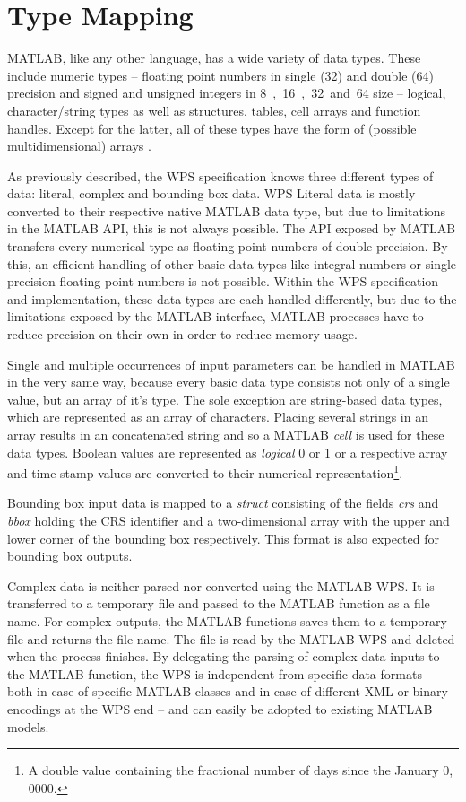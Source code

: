 \section{Type Mapping}
  \label{sec:matlab:type}
  MATLAB, like any other language, has a wide variety of data types. These include numeric types -- floating point numbers in single (\unit{32}{\bit}) and double (\unit{64}{\bit}) precision and signed and unsigned integers in \unit{8, 16, 32 and 64}{\bit} size -- logical, character/string types as well as structures, tables, cell arrays and function handles. Except for the latter, all of these types have the form of (possible multidimensional) arrays \citep{matlab}.

  As previously described, the \acl{WPS} specification knows three different types of data: literal, complex and bounding box data.
  \ac{WPS} Literal data is mostly converted to their respective native MATLAB data type, but due to limitations in the MATLAB \ac{API}, this is not always possible. The \ac{API} exposed by MATLAB transfers every numerical type as floating point numbers of double precision. By this, an efficient handling of other basic data types like integral numbers or single precision floating point numbers is not possible. Within the WPS specification and implementation, these data types are each handled differently, but due to the limitations exposed by the MATLAB interface, MATLAB processes have to reduce precision on their own in order to reduce memory usage.

  Single and multiple occurrences of input parameters can be handled in MATLAB in the very same way, because every basic data type consists not only of a single value, but an array of it's type. The sole exception are string-based data types, which are represented as an array of characters. Placing several strings in an array results in an concatenated string and so a MATLAB \emph{cell} is used for these data types. Boolean values are represented as \emph{logical} 0 or 1 or a respective array and time stamp values are converted to their numerical representation\footnote{A double value containing the fractional number of days since the January 0, 0000.}.

  Bounding box input data is mapped to a \emph{struct} consisting of the fields \emph{crs} and \emph{bbox} holding the \ac{CRS} identifier and a two-dimensional array with the upper and lower corner of the bounding box respectively. This format is also expected for bounding box outputs.

  Complex data is neither parsed nor converted using the MATLAB WPS. It is transferred to a temporary file and passed to the MATLAB function as a file name. For complex outputs, the MATLAB functions saves them to a temporary file and returns the file name. The file is read by the MATLAB WPS and deleted when the process finishes. By delegating the parsing of complex data inputs to the MATLAB function, the WPS is independent from specific data formats -- both in case of specific MATLAB classes and in case of different XML or binary encodings at the WPS end -- and can easily be adopted to existing MATLAB models.

